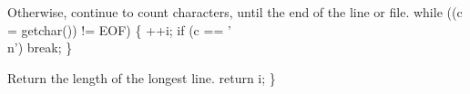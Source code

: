 \nwendcode{}\nwdocspar

Otherwise, continue to count characters, until the end of the line or file.
\nwenddocs{}\plusendmoddef
    while ((c = getchar()) != EOF) \{
        ++i;
        if (c == '\\n')
            break;
    \}

\nwendcode{}\nwdocspar

Return the length of the longest line.
\nwenddocs{}\plusendmoddef
    return i;
\}
\nwendcode{}\nwdocspar
\nwenddocs{}

